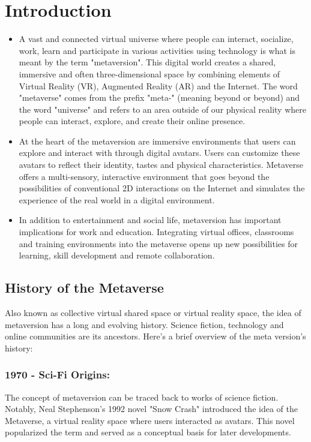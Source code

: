 \chapter{Introduction}
\label{sec:introduction}
\begin{itemize}
\item A vast and connected virtual universe where people can interact, socialize, work, learn and participate in various activities using technology is what is meant by the term "metaversion". This digital world creates a shared, immersive and often three-dimensional space by combining elements of Virtual Reality (VR), Augmented Reality (AR) and the Internet. The word "metaverse" comes from the prefix "meta-" (meaning beyond or beyond) and the word "universe" and refers to an area outside of our physical reality where people can interact, explore, and create their online presence.
\item At the heart of the metaversion are immersive environments that users can explore and interact with through digital avatars. Users can customize these avatars to reflect their identity, tastes and physical characteristics. Metaverse offers a multi-sensory, interactive environment that goes beyond the possibilities of conventional 2D interactions on the Internet and simulates the experience of the real world in a digital environment.
\item In addition to entertainment and social life, metaversion has important implications for work and education. Integrating virtual offices, classrooms and training environments into the metaverse opens up new possibilities for learning, skill development and remote collaboration.
\end{itemize}
\section{History of the Metaverse}
Also known as collective virtual shared space or virtual reality space, the idea of metaversion has a long and evolving history. Science fiction, technology and online communities are its ancestors. Here's a brief overview of the meta version's history:
\subsection{1970 - Sci-Fi Origins:}
The concept of metaversion can be traced back to works of science fiction. Notably, Neal Stephenson's 1992 novel "Snow Crash" introduced the idea of the Metaverse, a virtual reality space where users interacted as avatars. This novel popularized the term and served as a conceptual basis for later developments.

